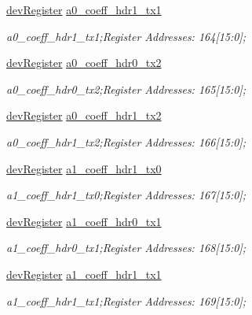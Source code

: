 \begin{DoxyCompactItemize}
\mbox{\hyperlink{classdev_register}{dev\+Register}} \mbox{\hyperlink{class_o_p_t3101_registers_af488759b29c7936c461c49cf044cffad}{a0\+\_\+coeff\+\_\+hdr1\+\_\+tx1}}
\begin{DoxyCompactList}\small\item\em a0\+\_\+coeff\+\_\+hdr1\+\_\+tx1;Register Addresses\+: 164\mbox{[}15\+:0\mbox{]}; \end{DoxyCompactList}\item 
\mbox{\hyperlink{classdev_register}{dev\+Register}} \mbox{\hyperlink{class_o_p_t3101_registers_aecbd85188dd275b98ddface473912eda}{a0\+\_\+coeff\+\_\+hdr0\+\_\+tx2}}
\begin{DoxyCompactList}\small\item\em a0\+\_\+coeff\+\_\+hdr0\+\_\+tx2;Register Addresses\+: 165\mbox{[}15\+:0\mbox{]}; \end{DoxyCompactList}\item 
\mbox{\hyperlink{classdev_register}{dev\+Register}} \mbox{\hyperlink{class_o_p_t3101_registers_a36cb461510548eccac1c1642b5521b43}{a0\+\_\+coeff\+\_\+hdr1\+\_\+tx2}}
\begin{DoxyCompactList}\small\item\em a0\+\_\+coeff\+\_\+hdr1\+\_\+tx2;Register Addresses\+: 166\mbox{[}15\+:0\mbox{]}; \end{DoxyCompactList}\item 
\mbox{\hyperlink{classdev_register}{dev\+Register}} \mbox{\hyperlink{class_o_p_t3101_registers_a6bda1b9f66c798b9eef110d3364ec5a2}{a1\+\_\+coeff\+\_\+hdr1\+\_\+tx0}}
\begin{DoxyCompactList}\small\item\em a1\+\_\+coeff\+\_\+hdr1\+\_\+tx0;Register Addresses\+: 167\mbox{[}15\+:0\mbox{]}; \end{DoxyCompactList}\item 
\mbox{\hyperlink{classdev_register}{dev\+Register}} \mbox{\hyperlink{class_o_p_t3101_registers_a75d9f7b97bff11c17447891dff5d0585}{a1\+\_\+coeff\+\_\+hdr0\+\_\+tx1}}
\begin{DoxyCompactList}\small\item\em a1\+\_\+coeff\+\_\+hdr0\+\_\+tx1;Register Addresses\+: 168\mbox{[}15\+:0\mbox{]}; \end{DoxyCompactList}\item 
\mbox{\hyperlink{classdev_register}{dev\+Register}} \mbox{\hyperlink{class_o_p_t3101_registers_a49e36e362f21a8fba8dbac0019e84312}{a1\+\_\+coeff\+\_\+hdr1\+\_\+tx1}}
\begin{DoxyCompactList}\small\item\em a1\+\_\+coeff\+\_\+hdr1\+\_\+tx1;Register Addresses\+: 169\mbox{[}15\+:0\mbox{]}; \end{DoxyCompactList}\item 

\end{DoxyCompactItemize}
